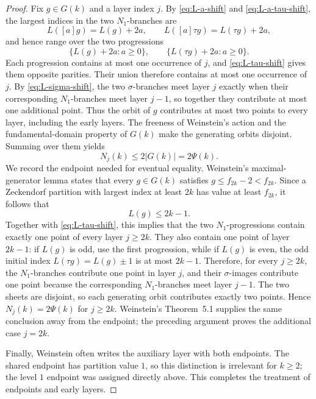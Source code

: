 \begin{proof}
Fix \(g\in G(k)\) and a layer index \(j\).  By
\eqref{eq:L-a-shift} and \eqref{eq:L-a-tau-shift}, the largest indices in the
two \(N_1\)-branches are
\[
 L([a]g)=L(g)+2a,
 \qquad
 L([a]\tau g)=L(\tau g)+2a,
\]
and hence range over the two progressions
\[
 \{L(g)+2a:a\ge0\},
 \qquad
 \{L(\tau g)+2a:a\ge0\}.
\]
Each progression contains at most one occurrence of \(j\), and
\eqref{eq:L-tau-shift} gives them opposite parities.  Their union therefore
contains at most one occurrence of \(j\).  By \eqref{eq:L-sigma-shift}, the
two \(\sigma\)-branches meet layer \(j\) exactly when their corresponding
\(N_1\)-branches meet layer \(j-1\), so together they contribute at most one
additional point.  Thus the orbit of \(g\) contributes at most two points to
every layer, including the early layers.  The freeness of Weinstein's action
and the fundamental-domain property of \(G(k)\) make the generating orbits
disjoint.  Summing over them yields
\[
 N_j(k)\le2\lvert G(k)\rvert=2\Psi(k).
\]
We record the endpoint needed for eventual equality.  Weinstein's
maximal-generator lemma states that every \(g\in G(k)\) satisfies
\(g\le f_{2k}-2<f_{2k}\).  Since a Zeckendorf partition with largest index
at least \(2k\) has value at least \(f_{2k}\), it follows that
\begin{equation}
 L(g)\le2k-1.
 \label{eq:generator-largest-index-bound}
\end{equation}
Together with \eqref{eq:L-tau-shift}, this implies that the two
\(N_1\)-progressions contain exactly one point of every layer \(j\ge2k\).
They also contain one point of layer \(2k-1\): if \(L(g)\) is odd, use the
first progression, while if \(L(g)\) is even, the odd initial index
\(L(\tau g)=L(g)\mathbin{\pm}1\) is at most \(2k-1\).  Therefore, for every
\(j\ge2k\), the \(N_1\)-branches contribute one point in layer \(j\), and
their \(\sigma\)-images contribute one point because the corresponding
\(N_1\)-branches meet layer \(j-1\).  The two sheets are disjoint, so each
generating orbit contributes exactly two points.  Hence
\(N_j(k)=2\Psi(k)\) for \(j\ge2k\).  Weinstein's Theorem~5.1 supplies the
same conclusion away from the endpoint; the preceding argument proves the
additional case \(j=2k\).

Finally, Weinstein often writes the auxiliary layer with both endpoints.
The shared endpoint has partition value \(1\), so this distinction is
irrelevant for \(k\ge2\); the level \(1\) endpoint was assigned directly
above.  This completes the treatment of endpoints and early layers.
\end{proof}

